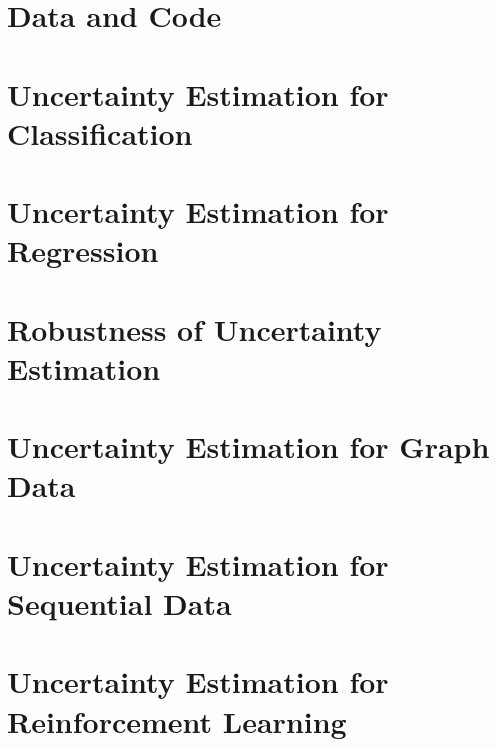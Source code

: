 \documentclass[%
]{tumDiss}
\begin{document}
\appendix
\chapter{Data and Code}

\chapter{Uncertainty Estimation for Classification}

\chapter{Uncertainty Estimation for Regression}

\chapter{Robustness of Uncertainty Estimation}

\chapter{Uncertainty Estimation for Graph Data}

\chapter{Uncertainty Estimation for Sequential Data}

\chapter{Uncertainty Estimation for Reinforcement Learning}

\end{document}
